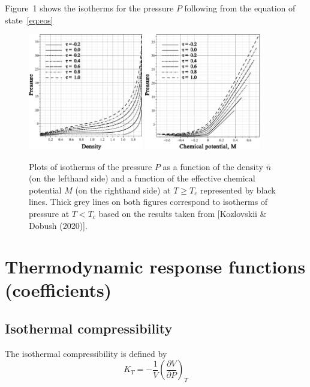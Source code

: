 \documentclass[12pt]{article}
\begin{document}
	Figure~1 shows the isotherms for the pressure $P$ following from the equation of state~\ref{eq:eos}
	\begin{figure}[h!]
		\includegraphics[width=0.446\textwidth]{f1a1.pdf} 
		\includegraphics[width=0.45\textwidth]{f1b1.pdf} 
		\vskip-3mm\caption{Plots of isotherms of the pressure $P$ as a function of the density $\bar n$ (on the lefthand side) and a function of the effective chemical potential $M$ (on the righthand side) at $T \geq T_c$ represented by black lines. Thick grey lines on both figures correspond to isotherms of pressure at $T < T_c$ based on the results taken from [Kozlovskii $\&$ Dobush (2020)]. 
		}\label{fig1}
	\end{figure}
	
	\section{Thermodynamic response functions (coefficients)}
	
	\subsection{Isothermal compressibility}
	The isothermal compressibility is defined by
	\begin{equation}
		\label{def:isotherm_compres}
		K_T = -\frac{1}{V}\left(\frac{\partial V}{\partial P}\right)_T
	\end{equation}
	
\end{document}
